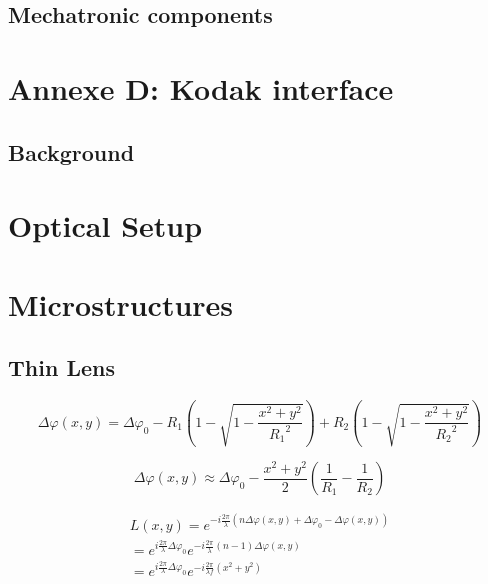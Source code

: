 \documentclass{kepfl}
\begin{document}
\section{Mechatronic components}

\chapter{Annexe D: Kodak interface}
\section{Background}


\chapter{Optical Setup}

\chapter{Microstructures}


\section{Thin Lens}

\begin{equation}
\Delta \varphi (x,y) = \Delta {\varphi _0} - {R_1}\left( {1 - \sqrt {1 - \frac{{{x^2} + {y^2}}}{{{R_1}^2}}} } \right) + {R_2}\left( {1 - \sqrt {1 - \frac{{{x^2} + {y^2}}}{{{R_2}^2}}} } \right)
\end{equation}

\begin{equation}
\Delta \varphi (x,y) \approx \Delta {\varphi _0} - \frac{{{x^2} + {y^2}}}{2}\left( {\frac{1}{{{R_1}}} - \frac{1}{{{R_2}}}} \right)
\end{equation}


\begin{equation}
	\begin{array}{c}
L(x,y) = {e^{ - i\frac{{2\pi }}{\lambda }\left( {n\Delta \varphi (x,y) + \Delta {\varphi _0} - \Delta \varphi (x,y)} \right)}}\\
 = {e^{i\frac{{2\pi }}{\lambda }\Delta {\varphi _0}}}{e^{ - i\frac{{2\pi }}{\lambda }(n - 1)\Delta \varphi (x,y)}}\\
 = {e^{i\frac{{2\pi }}{\lambda }\Delta {\varphi _0}}}{e^{ - i\frac{{2\pi }}{{\lambda f}}({x^2} + {y^2})}}
\end{array}
\end{equation}
\end{document}

